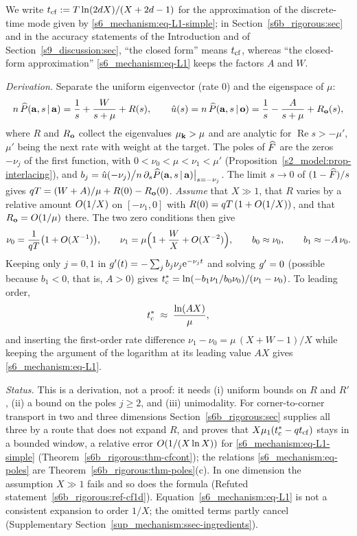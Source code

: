 \noindent We write $t_{\mathrm{cf}}:=T\ln(2d X)/(X+2d-1)$ for the approximation of the discrete-time mode given by
\eqref{s6_mechanism:eq-L1-simple}; in Section~\ref{s6b_rigorous:sec} and in the accuracy statements of the Introduction
and of Section~\ref{s9_discussion:sec}, ``the closed form'' means $t_{\mathrm{cf}}$, whereas ``the closed-form approximation''
\eqref{s6_mechanism:eq-L1} keeps the factors $A$ and $W$.

\noindent\emph{Derivation.} Separate the uniform eigenvector (rate $0$) and the eigenspace of $\mu$:
\begin{equation}\label{s6_mechanism:eq-split}
  n\,\widehat{P}(\mathbf{a},s\,|\,\mathbf{a})=\frac1s+\frac{W}{s+\mu}+R(s),\qquad
  \hat u(s)=n\,\widehat{P}(\mathbf{a},s\,|\,\mathbf{o})=\frac1s-\frac{A}{s+\mu}+R_{\mathbf{o}}(s),
\end{equation}
where $R$ and $R_{\mathbf{o}}$ collect the eigenvalues $\mu_{\mathbf{k}}>\mu$ and are analytic for $\operatorname{Re}s>-\mu'$, $\mu'$
being the next rate with weight at the target. The poles of $\widehat{F}$ are the zeros $-\nu_j$ of the first function, with
$0<\nu_0<\mu<\nu_1<\mu'$ (Proposition~\ref{s2_model:prop-interlacing}), and
$b_j=\hat u(-\nu_j)\big/n\,\partial_s\widehat{P}(\mathbf{a},s\,|\,\mathbf{a})\big|_{s=-\nu_j}$. The limit $s\to0$ of $(1-\widehat{F})/s$ gives
$qT=(W+A)/\mu+R(0)-R_{\mathbf{o}}(0)$. \emph{Assume} that $X\gg1$, that $R$ varies by a relative amount $O(1/X)$ on
$[-\nu_1,0]$ with $R(0)=qT\,(1+O(1/X))$, and that $R_{\mathbf{o}}=O(1/\mu)$ there. The two zero conditions then give
\begin{equation}\label{s6_mechanism:eq-poles}
  \nu_0=\frac{1}{qT}\bigl(1+O(X^{-1})\bigr),\qquad
  \nu_1=\mu\Bigl(1+\frac{W}{X}+O(X^{-2})\Bigr),\qquad
  b_0\approx\nu_0,\qquad b_1\approx-A\,\nu_0 .
\end{equation}
Keeping only $j=0,1$ in $g'(t)=-\sum_j b_j\nu_j\mathrm{e}^{-\nu_j t}$ and solving $g'=0$ (possible because $b_1<0$, that is,
$A>0$) gives $t^{*}_{\mathrm{c}}=\ln(-b_1\nu_1/b_0\nu_0)/(\nu_1-\nu_0)$. To leading order,
\begin{equation}\label{s6_mechanism:eq-L0}
  t^{*}_{\mathrm{c}}\;\approx\;\frac{\ln(AX)}{\mu},
\end{equation}
and inserting the first-order rate difference $\nu_1-\nu_0=\mu\,(X+W-1)/X$ while keeping the argument of the logarithm at
its leading value $AX$ gives \eqref{s6_mechanism:eq-L1}.

\medskip\noindent\emph{Status.} This is a derivation, not a proof: it needs (i) uniform bounds on $R$ and $R'$, (ii) a bound
on the poles $j\ge2$, and (iii) unimodality. For corner-to-corner transport in two and three dimensions
Section~\ref{s6b_rigorous:sec} supplies all three by a route that does not expand $R$, and proves that
$X\mu_{1}(t^{*}_{\mathrm{c}}-qt_{\mathrm{cf}})$ stays in a bounded window, a relative error $O(1/(X\ln X))$ for \eqref{s6_mechanism:eq-L1-simple}
(Theorem~\ref{s6b_rigorous:thm-cfcont}); the relations \eqref{s6_mechanism:eq-poles} are
Theorem~\ref{s6b_rigorous:thm-poles}(c). In one dimension the assumption $X\gg1$ fails and so does the formula (Refuted
statement~\ref{s6b_rigorous:ref-cf1d}). Equation~\eqref{s6_mechanism:eq-L1} is not a consistent expansion to order
$1/X$; the omitted terms partly cancel (Supplementary Section~\ref{sup_mechanism:ssec-ingredients}).

